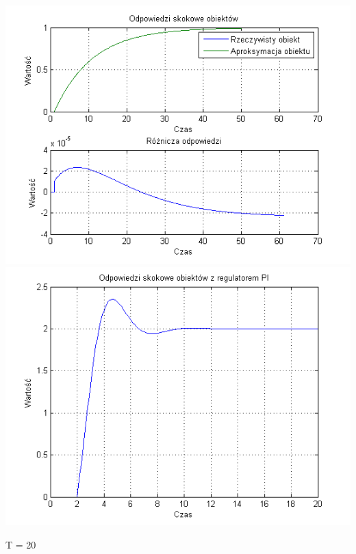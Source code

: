 \documentclass[10pt,a4paper]{article}
\begin{document}
\begin{center}
\includegraphics[scale=1]{images/jeden/skrypt_29.png}\\
\includegraphics[scale=1]{images/jeden/skrypt_30.png}\\
\end{center}
\newpage
T = 20
\end{document}
